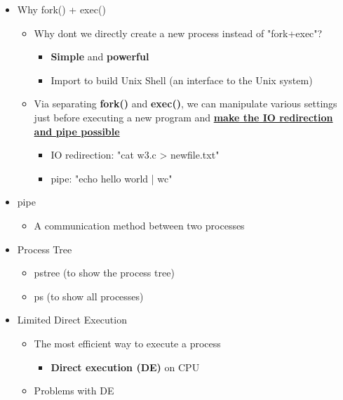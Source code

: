 \documentclass[a4paper,11pt,english]{article}
\begin{document}
\begin{itemize}
\begin{itemize}
        \end{itemize}
    \item Why fork() + exec()
        \begin{itemize}
            \item Why dont we directly create a new process instead of "fork+exec"?
                \begin{itemize}
                    \item \textbf{\color{blue}Simple} and \textbf{\color{blue}powerful}
                    \item Import to build Unix Shell (an interface to the Unix system)
                \end{itemize}
            \item Via separating \textbf{\color{blue}fork()} and \textbf{\color{blue}exec()}, we can manipulate various settings just before executing a new program and \textbf{\underline{make the IO redirection and pipe possible}}
                \begin{itemize}
                    \item IO redirection: "cat w3.c > newfile.txt"
                    \item pipe: "echo hello world | wc"
                \end{itemize}
        \end{itemize}
    \item pipe
        \begin{itemize}
            \item A communication method between two processes 
        \end{itemize}
    \item Process Tree
        \begin{itemize}
            \item pstree (to show the process tree)
            \item ps (to show all processes)
        \end{itemize} 
    \item Limited Direct Execution
        \begin{itemize}
            \item The most efficient way to execute a process
                \begin{itemize}
                    \item \textbf{\color{blue}Direct execution (DE)} on CPU
                \end{itemize}
            \item Problems with DE

\end{itemize}
\end{itemize}
\end{document}
